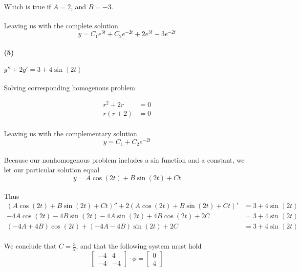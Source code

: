 \documentclass{article}
\begin{document}
\paragraph{}Which is true if $A=2$, and $B = -3$.
\paragraph{}Leaving us with the complete solution
\[
    y = C_1e^{3t}+C_2e^{-2t}+2e^{3t}-3e^{-2t}
\]
\paragraph{(5)} $y''+2y'=3+4\sin(2t)$
\paragraph{}Solving corresponding homogenous problem

\begin{align*}
    r^2 + 2r &= 0\\
    r(r+2) &= 0
\end{align*}

\paragraph{}Leaving us with the complementary solution
\[
    y = C_1 + C_2e^{-2t} 
\]
\paragraph{}Because our nonhomogenous problem includes a sin function and 
a constant, we let our particular solution equal
\[
    y = A\cos(2t) + B\sin(2t) + Ct
\]
\paragraph{}Thus
\begin{align*}
    (A\cos(2t)+B\sin(2t)+Ct)'' + 2(A\cos(2t)+B\sin(2t)+Ct)' &= 3 + 4\sin(2t)\\
    -4A\cos(2t) -4B\sin(2t) - 4A\sin(2t) +4B\cos(2t) + 2C &= 3 + 4\sin(2t)\\
    (-4A + 4B)\cos(2t) + (-4A - 4B)\sin(2t) + 2C &= 3 + 4\sin(2t)
\end{align*}
\paragraph{}We conclude that $C = \frac{3}{2}$, and that the following system must hold
\[
  \begin{bmatrix}
      -4 & 4 \\
      -4 & -4 
  \end{bmatrix} 
  \cdot \phi
  =
  \begin{bmatrix}
    0\\
    4
  \end{bmatrix}
\]
\end{document}
